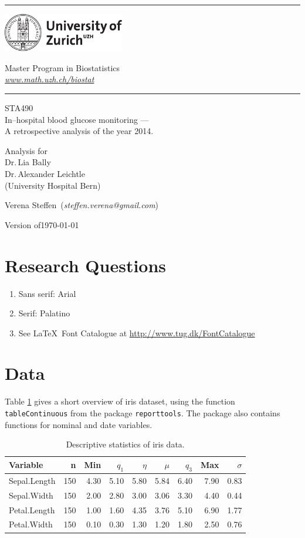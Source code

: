 \documentclass[11pt,a4paper,twoside]{article}\usepackage[]{graphicx}\usepackage[]{color}
\makeatletter
\newcommand{\name}{Verena Steffen}
\newcommand{\mail}{steffen.verena@gmail.com}
\newcommand{\versiondate}{\today}
\newcommand{\client}{\\
Dr.\,Lia Bally\\
Dr.\,Alexander Leichtle\\
(University Hospital Bern)}
\newcommand{\subtitle}{STA490\\
In--hospital blood glucose monitoring ---\\
A retrospective analysis of the year 2014.}
\newcommand{\web}{www.math.uzh.ch/biostat}
\newcommand{\grp}{Master Program in Biostatistics}
\newcommand{\img}{\includegraphics[height=17mm, width = 53mm]{uzh_logo_e_pos}}
\newcommand{\of}{of\xspace}
\newcommand{\HRule}{\rule{\linewidth}{0.5mm}}
\newcommand{\mytitle}[3]{
\begin{center}
\vspace*{-2.1cm}

\HRule

\vspace*{0.4cm}

\begin{minipage}{0.4\textwidth}
\thispagestyle{empty}
\begin{flushleft}
\hspace*{1cm}\img
\end{flushleft}
\end{minipage}
\begin{minipage}{0.59\textwidth}
\begin{flushleft} \large
    \hspace*{3.8cm} \textsf{\grp} \\
    \hspace*{3.8cm} \href{http://\web}{\textsf{\emph{\web}}}
\end{flushleft}
\end{minipage}

\vspace*{0.4cm} \HRule

\bigskip

\textsf{\LARGE #2} \vspace*{0.5cm}

\large{#1}

\medskip

\large{\name \ (\textit{\mail})}

\medskip

Version \of \versiondate

\end{center}

\medskip
}
\newcommand{\pkg}[1]{\texttt{#1}}
\makeatother
\begin{document}

\pagestyle{standard}
\mytitle{Analysis for \client}{\subtitle}
\tableofcontents

\bigskip





















\section{Research Questions} \label{sec:questions}
\begin{enumerate}
    \item \textsf{Sans serif}: Arial
    \item Serif: Palatino
    \item See \LaTeX\ Font Catalogue at \url{http://www.tug.dk/FontCatalogue}
\end{enumerate}

\section{Data} \label{sec:data}
Table \ref{tab:iris} gives a short overview of iris dataset, using the
function \texttt{tableContinuous} from the package
\pkg{reporttools}. The package also contains functions for nominal and
date variables.

\begin{table}[ht]
\centering
{\footnotesize
\begin{tabular}{lrrrrrrrr}
 {\bf Variable} & n & Min & $q_1$ & $\eta$ & $\mu$ & $q_3$ & Max & $\sigma$ \\ 
  \hline
Sepal.Length & 150 & 4.30 & 5.10 & 5.80 & 5.84 & 6.40 & 7.90 & 0.83 \\ 
  Sepal.Width & 150 & 2.00 & 2.80 & 3.00 & 3.06 & 3.30 & 4.40 & 0.44 \\ 
  Petal.Length & 150 & 1.00 & 1.60 & 4.35 & 3.76 & 5.10 & 6.90 & 1.77 \\ 
  Petal.Width & 150 & 0.10 & 0.30 & 1.30 & 1.20 & 1.80 & 2.50 & 0.76 \\ 
  \end{tabular}
}
\caption{Descriptive statistics of iris data.} 
\label{tab:iris}
\end{table}
\end{document}
